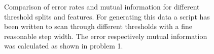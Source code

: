 \documentclass[12pt]{article}
\begin{document}
\begin{figure}[t!]
	\centering
	\hfill
	\hfill
	\hfill
	\caption[]{Comparison of error rates and mutual information for different threshold splits and features. For generating this data a script has been written to scan through different thresholds with a fine reasonable step width. The error respectively mutual information was calculated as shown in problem 1. }
	\label{fig:2.1}
\end{figure}
\end{document}
